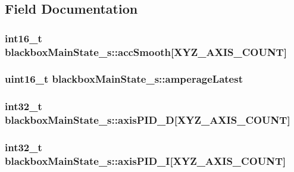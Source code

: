 \subsection{Field Documentation}
\hypertarget{structblackboxMainState__s_a7fdaef47b1820d80de5f98a3f26ed892}{
\subsubsection[{acc\+Smooth}]{\setlength{\rightskip}{0pt plus 5cm}int16\+\_\+t blackbox\+Main\+State\+\_\+s\+::acc\+Smooth\mbox{[}{\bf X\+Y\+Z\+\_\+\+A\+X\+I\+S\+\_\+\+C\+O\+U\+N\+T}\mbox{]}}}\label{structblackboxMainState__s_a7fdaef47b1820d80de5f98a3f26ed892}
\hypertarget{structblackboxMainState__s_ab6df3da6c422e418006f8ad2666c75ee}{
\subsubsection[{amperage\+Latest}]{\setlength{\rightskip}{0pt plus 5cm}uint16\+\_\+t blackbox\+Main\+State\+\_\+s\+::amperage\+Latest}}\label{structblackboxMainState__s_ab6df3da6c422e418006f8ad2666c75ee}
\hypertarget{structblackboxMainState__s_a9d07a90cd3653feec4d5bc42d5ee81a0}{
\subsubsection[{axis\+P\+I\+D\+\_\+\+D}]{\setlength{\rightskip}{0pt plus 5cm}int32\+\_\+t blackbox\+Main\+State\+\_\+s\+::axis\+P\+I\+D\+\_\+\+D\mbox{[}{\bf X\+Y\+Z\+\_\+\+A\+X\+I\+S\+\_\+\+C\+O\+U\+N\+T}\mbox{]}}}\label{structblackboxMainState__s_a9d07a90cd3653feec4d5bc42d5ee81a0}
\hypertarget{structblackboxMainState__s_aaf37c5aeff41b3dd1eae418405d59144}{
\subsubsection[{axis\+P\+I\+D\+\_\+\+I}]{\setlength{\rightskip}{0pt plus 5cm}int32\+\_\+t blackbox\+Main\+State\+\_\+s\+::axis\+P\+I\+D\+\_\+\+I\mbox{[}{\bf X\+Y\+Z\+\_\+\+A\+X\+I\+S\+\_\+\+C\+O\+U\+N\+T}\mbox{]}}}\label{structblackboxMainState__s_aaf37c5aeff41b3dd1eae418405d59144}
